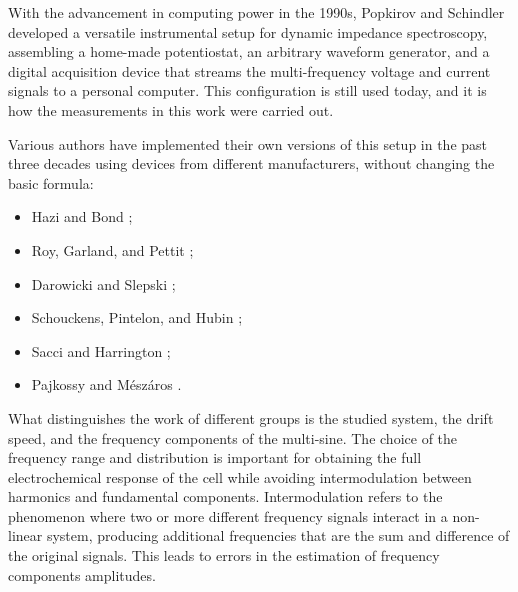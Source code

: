 

With the advancement in computing power in the 1990s, Popkirov and Schindler developed a versatile instrumental setup for dynamic impedance spectroscopy, assembling a home-made potentiostat, an arbitrary waveform generator, and a digital acquisition device that streams the multi-frequency voltage and current signals to a personal computer.
This configuration is still used today, and it is how the measurements in this work were carried out.

Various authors have implemented their own versions of this setup in the past three decades using devices from different manufacturers, without changing the basic formula:
\begin{itemize}
    \item Hazi and Bond \cite{haziMicrocomputerbasedInstrumentationMultifrequency1997};
    \item Roy, Garland, and Pettit \cite{waltersWeakAdsorptionAnions2001a};
    \item Darowicki and Slepski \cite{darowickiInstantaneousElectrochemicalImpedance2004a};
    \item Schouckens, Pintelon, and Hubin \cite{vangheemElectrochemicalImpedanceSpectroscopy2004a};
    \item Sacci and Harrington \cite{sacciDynamicImpedanceFormic2009};
    \item Pajkossy and Mészáros \cite{pajkossyConnectionCVsImpedance2020}.
\end{itemize}

What distinguishes the work of different groups is the studied system, the drift speed, and the frequency components of the multi-sine.
The choice of the frequency range and distribution is important for obtaining the full electrochemical response of the cell while avoiding intermodulation between harmonics and fundamental components.
Intermodulation refers to the phenomenon where two or more different frequency signals interact in a non-linear system, producing additional frequencies that are the sum and difference of the original signals. This leads to errors in the estimation of frequency components amplitudes.

